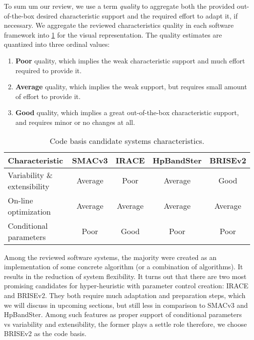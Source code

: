 To sum um our review, we use a term \emph{quality} to aggregate both the provided  out-of-the-box desired characteristic support and the required effort to adapt it, if necessary. We aggregate the reviewed characteristics quality in each software framework into \cref{iml: table code basis selection} for the visual representation.
The quality estimates are quantized into three ordinal values:
\begin{enumerate}
	\item \textbf{Poor} quality, which implies the weak characteristic support and much effort required to provide it.
	
	\item \textbf{Average} quality, which implies the weak support, but requires small amount of effort to provide it.
	
	\item \textbf{Good} quality, which implies a great out-of-the-box characteristic support, and requires minor or no changes at all.
\end{enumerate}

\begin{table}[h!]
	\centering
	\begin{tabular}{l||cccc}
		\textbf{Characteristic} & \textbf{SMACv3}& \textbf{IRACE} & \textbf{HpBandSter} & \textbf{BRISEv2} \\
		\hline
		\hline
		Variability \& extensibility & \cellcolor{yellow!25}Average & \cellcolor{red!25}Poor & \cellcolor{yellow!25}Average & \cellcolor{green!25}Good \\
	
		On-line optimization & \cellcolor{yellow!25}Average & \cellcolor{yellow!25}Average & \cellcolor{yellow!25}Average & \cellcolor{yellow!25}Average \\
	
		Conditional parameters & \cellcolor{red!25}Poor & \cellcolor{green!25}Good & \cellcolor{red!25}Poor & \cellcolor{red!25}Poor \\
	\end{tabular}
	\caption{Code basis candidate systems characteristics.}
	\label{iml: table code basis selection}
\end{table}

Among the reviewed software systems, the majority were created as an implementation of some concrete algorithm (or a combination of algorithms). It results in the reduction of system flexibility. It turns out that there are two most promising candidates for hyper-heuristic with parameter control creation: IRACE and BRISEv2. They both require much adaptation and preparation steps, which we will discuss in upcoming sections, but still less in comparison to SMACv3 and HpBandSter. Among such features as proper support of conditional parameters vs variability and extensibility, the former plays a settle role therefore, we choose BRISEv2 as the code basis.

